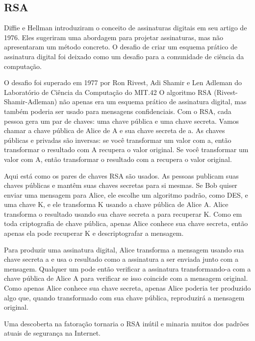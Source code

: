 \documentclass{book}
\begin{document}

\subsection{RSA}
\label{segredos:rsa}

Diffie e Hellman introduziram o conceito de assinaturas digitais em seu artigo de 1976. Eles sugeriram uma abordagem para projetar assinaturas, mas não apresentaram um método concreto. O desafio de criar um esquema prático de assinatura digital foi deixado como um desafio para a comunidade de ciência da computação.

O desafio foi superado em 1977 por Ron Rivest, Adi Shamir e Len Adleman do Laboratório de Ciência da Computação do MIT.42 O algoritmo RSA (Rivest-Shamir-Adleman) não apenas era um esquema prático de assinatura digital, mas também poderia ser usado para mensagens confidenciais. Com o RSA, cada pessoa gera um par de chaves: uma chave pública e uma chave secreta. Vamos chamar a chave pública de Alice de A e sua chave secreta de a. As chaves públicas e privadas são inversas: se você transformar um valor com a, então transformar o resultado com A recupera o valor original. Se você transformar um valor com A, então transformar o resultado com a recupera o valor original.

Aqui está como os pares de chaves RSA são usados. As pessoas publicam suas chaves públicas e mantêm suas chaves secretas para si mesmas. Se Bob quiser enviar uma mensagem para Alice, ele escolhe um algoritmo padrão, como DES, e uma chave K, e ele transforma K usando a chave pública de Alice A. Alice transforma o resultado usando sua chave secreta a para recuperar K. Como em toda criptografia de chave pública, apenas Alice conhece sua chave secreta, então apenas ela pode recuperar K e descriptografar a mensagem.

Para produzir uma assinatura digital, Alice transforma a mensagem usando sua chave secreta a e usa o resultado como a assinatura a ser enviada junto com a mensagem. Qualquer um pode então verificar a assinatura transformando-a com a chave pública de Alice A para verificar se isso coincide com a mensagem original. Como apenas Alice conhece sua chave secreta, apenas Alice poderia ter produzido algo que, quando transformado com sua chave pública, reproduzirá a mensagem original.

Uma descoberta na fatoração tornaria o RSA inútil e minaria muitos dos padrões atuais de segurança na Internet.
\end{document}
